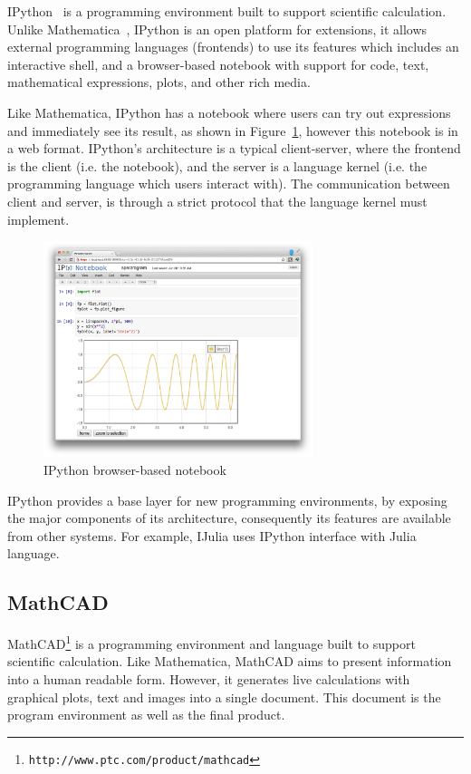 IPython~\citep{PER-GRA:2007} is a programming environment built to support scientific calculation. Unlike Mathematica~\citep{wolfram1991mathematica},  IPython is an open platform for extensions, it allows external programming languages (frontends) to use its features which includes an interactive shell, and a browser-based notebook with support for code, text, mathematical expressions, plots, and other rich media. 

Like Mathematica, IPython has a notebook where users can try out expressions and immediately see its result, as shown in Figure~\ref{fig:ipython}, however this notebook is in a web format. IPython's architecture is a typical client-server, where the frontend is the client (i.e. the notebook), and the server is a language kernel (i.e. the programming language which users interact with). The communication between client and server, is through a strict protocol that the language kernel must implement. 

\begin{figure}[!htbp]
  \centering
    \includegraphics[width=0.7\textwidth]{images/ipython}
 \caption{IPython browser-based notebook}
    \label{fig:ipython}
\end{figure}

IPython provides a base layer for new programming environments, by exposing the major components of its architecture, consequently its features are available from other systems. For example, IJulia uses IPython interface with Julia language. 
\subsection{MathCAD}
\label{subsec:mathcad}
MathCAD\footnote{\texttt{http://www.ptc.com/product/mathcad}} is a programming environment and language built to support scientific calculation. Like Mathematica, MathCAD aims to present information into a human readable form. However, it generates live calculations with graphical plots, text and images into a single document. This document is the program environment as well as the final product.

